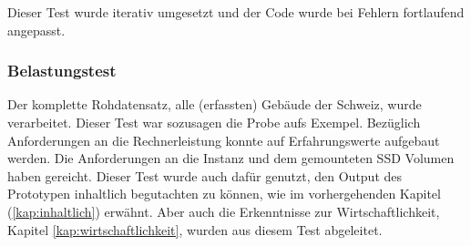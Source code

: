 Dieser Test wurde iterativ umgesetzt und der Code wurde bei Fehlern fortlaufend angepasst. 


\subsubsection{Belastungstest}\label{kap:belastungstest}
Der komplette Rohdatensatz, alle (erfassten) Gebäude der Schweiz, wurde verarbeitet. Dieser Test war sozusagen die Probe aufs Exempel. Bezüglich Anforderungen an die Rechnerleistung konnte auf Erfahrungswerte aufgebaut werden. Die Anforderungen an die Instanz und dem gemounteten SSD Volumen haben gereicht. Dieser Test wurde auch dafür genutzt, den Output des Prototypen inhaltlich begutachten zu können, wie im vorhergehenden Kapitel (\ref{kap:inhaltlich}) erwähnt. Aber auch die Erkenntnisse zur Wirtschaftlichkeit, Kapitel \ref{kap:wirtschaftlichkeit}, wurden aus diesem Test abgeleitet.

